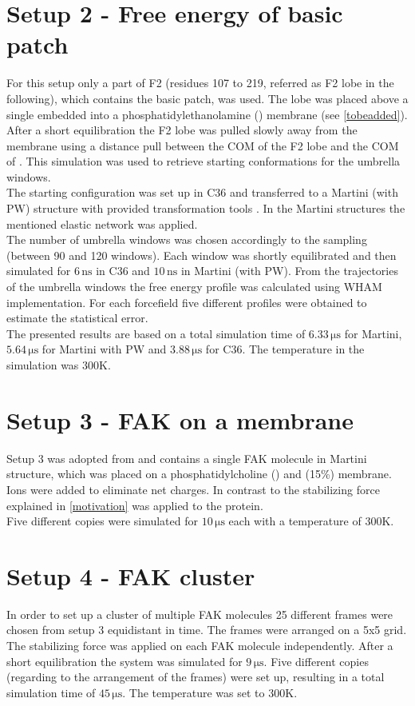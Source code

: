 \section{Setup 2 - Free energy of basic patch}
\label{setup:setup2}
For this setup only a part of F2 (residues 107 to 219, referred as F2 lobe in the following), which contains the basic patch, was used. The lobe was placed above a single \pip{} embedded into a phosphatidylethanolamine (\pope{}) membrane (see \autoref{tobeadded}). After a short equilibration the F2 lobe was pulled slowly away from the membrane using a distance pull between the COM of the F2 lobe and the COM of \pip{}. This simulation was used to retrieve starting conformations for the umbrella windows.\\
The starting configuration was set up in C36 and transferred to a Martini (with PW) structure with provided transformation tools \autocite{backwardpy}. In the Martini structures the mentioned elastic network was applied.\\
The number of umbrella windows was chosen accordingly to the sampling (between 90 and 120 windows). Each window was shortly equilibrated and then simulated for $6\,\si{\nano\second}$ in C36 and $10\,\si{\nano\second}$ in Martini (with PW). From the trajectories of the umbrella windows the free energy profile was calculated using \gromacs{} WHAM implementation. For each forcefield five different profiles were obtained to estimate the statistical error.\\
The presented results are based on a total simulation time of $6.33\,\si{\micro\second}$ for Martini, $5.64\,\si{\micro\second}$ for Martini with PW and $3.88\,\si{\micro\second}$ for C36. The temperature in the simulation was $300\si{\kelvin}$. %
\section{Setup 3 - FAK on a \pip{} membrane}
\label{setup:setup3}
Setup 3 was adopted from \textcite{sara} and contains a single FAK molecule in Martini structure, which was placed on a phosphatidylcholine (\popc{}) and \pip{} (15\%) membrane. Ions were added to eliminate net charges. In contrast to \textcite{sara} the stabilizing force explained in \autoref{motivation} was applied to the protein.\\
Five different copies were simulated for $10\,\si{\micro\second}$ each with a temperature of $300\si{\kelvin}$.
\section{Setup 4 - FAK cluster}
In order to set up a cluster of multiple FAK molecules 25 different frames were chosen from setup 3 equidistant in time. The frames were arranged on a {5x5} grid. The stabilizing force was applied on each FAK molecule independently. After a short equilibration the system was simulated for $9\,\si{\micro\second}$. Five different copies (regarding to the arrangement of the frames) were set up, resulting in a total simulation time of $45\,\si{\micro\second}$. The temperature was set to $300\si{\kelvin}$.